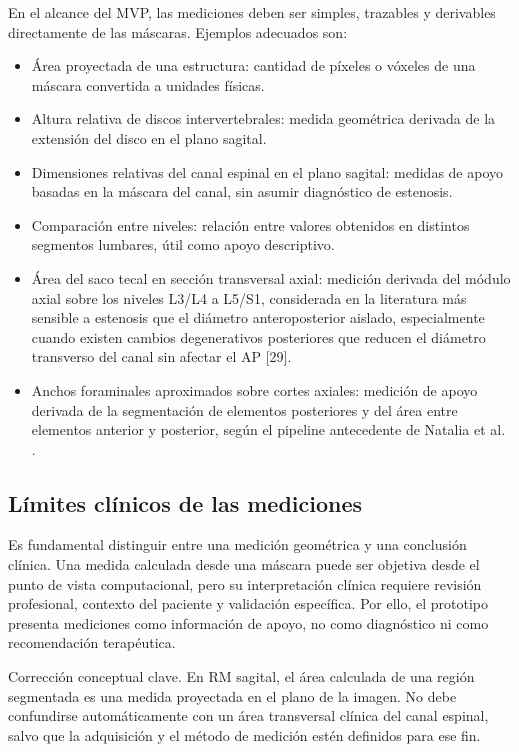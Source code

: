 En el alcance del MVP, las mediciones deben ser simples, trazables y derivables directamente de las máscaras. Ejemplos adecuados son:

\begin{itemize}
  \item Área proyectada de una estructura: cantidad de píxeles o vóxeles de una máscara convertida a unidades físicas.
  \item Altura relativa de discos intervertebrales: medida geométrica derivada de la extensión del disco en el plano sagital.
  \item Dimensiones relativas del canal espinal en el plano sagital: medidas de apoyo basadas en la máscara del canal, sin asumir diagnóstico de estenosis.
  \item Comparación entre niveles: relación entre valores obtenidos en distintos segmentos lumbares, útil como apoyo descriptivo.
  \item Área del saco tecal en sección transversal axial: medición derivada del módulo axial sobre los niveles L3/L4 a L5/S1, considerada en la literatura más sensible a estenosis que el diámetro anteroposterior aislado, especialmente cuando existen cambios degenerativos posteriores que reducen el diámetro transverso del canal sin afectar el AP [29].
  \item Anchos foraminales aproximados sobre cortes axiales: medición de apoyo derivada de la segmentación de elementos posteriores y del área entre elementos anterior y posterior, según el pipeline antecedente de Natalia et al. \parencite{natalia_measurement_2020}.
\end{itemize}

\subsection{Límites clínicos de las mediciones}

Es fundamental distinguir entre una medición geométrica y una conclusión clínica. Una medida calculada desde una máscara puede ser objetiva desde el punto de vista computacional, pero su interpretación clínica requiere revisión profesional, contexto del paciente y validación específica. Por ello, el prototipo presenta mediciones como información de apoyo, no como diagnóstico ni como recomendación terapéutica.

Corrección conceptual clave. En RM sagital, el área calculada de una región segmentada es una medida proyectada en el plano de la imagen. No debe confundirse automáticamente con un área transversal clínica del canal espinal, salvo que la adquisición y el método de medición estén definidos para ese fin.

